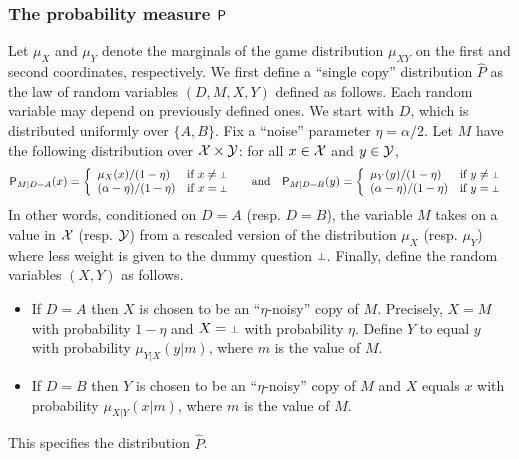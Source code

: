 

\subsubsection{The probability measure $\P$} 
\label{sec:p_setup}
Let $\mu_X$ and $\mu_Y$ denote the marginals of the game distribution $\mu_{XY}$ on the first and second coordinates, respectively. 
We first define a ``single copy'' distribution $\hat{P}$ as the law of random variables $(D,M,X,Y)$ defined as follows. Each random variable may depend on previously defined ones. We start with $D$, which is distributed uniformly over $\{A,B\}$. Fix a ``noise'' parameter $\eta = \alpha/2$. Let $M$ have the following distribution over $\X\times \Y$: for all $x \in \X$ and $y \in \Y$,
\[
	\P_{M | D = A}(x) = \left\{
	\begin{array}{ll}
		\mu_X(x)/(1 - \eta)  & \mbox{if $x \neq \dummy$} \\
		(\alpha - \eta)/(1 - \eta) & \mbox{if $x = \dummy$ }
	\end{array}
\right. \quad \text{and} \quad
	\P_{M | D = B}(y) = \left\{
	\begin{array}{ll}
		\mu_Y(y)/(1 - \eta)  & \mbox{if $y \neq \dummy$} \\
		(\alpha - \eta)/(1 - \eta) & \mbox{if $y = \dummy$ }
	\end{array}
\right.
\]
In other words, conditioned on $D=A$ (resp. $D = B$), the variable $M$ takes on a value in $\X$ (resp. $\Y$) from a rescaled version of the distribution $\mu_X$ (resp. $\mu_Y$) where less weight is given to the dummy question $\dummy$. Finally, define the random variables $(X,Y)$ as follows. 
\begin{itemize}
	\item If $D = A$ then $X$ is chosen to be an ``$\eta$-noisy'' copy of $M$. Precisely, $X = M$ with probability $1 - \eta$ and $X = \dummy$ with probability $\eta$. Define $Y$ to equal $y$ with probability $\mu_{Y|X}(y | m)$, where $m$ is the value of $M$. 
	\item If $D = B$ then $Y$ is chosen to be an ``$\eta$-noisy'' copy of $M$ and $X$ equals $x$ with probability $\mu_{X|Y}(x | m)$, where $m$ is the value of $M$. 
\end{itemize}
This specifies the distribution $\hat{P}$. 


